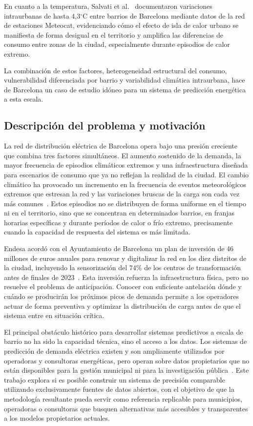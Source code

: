 \documentclass[12pt, a4paper]{article}
\begin{document}
En cuanto a la temperatura, Salvati et al.~\cite{salvati2017} documentaron variaciones intraurbanas de hasta 4,3$^\circ$C entre barrios de Barcelona mediante datos de la red de estaciones Meteocat, evidenciando cómo el efecto de isla de calor urbano se manifiesta de forma desigual en el territorio y amplifica las diferencias de consumo entre zonas de la ciudad, especialmente durante episodios de calor extremo.

La combinación de estos factores, heterogeneidad estructural del consumo, vulnerabilidad diferenciada por barrio y variabilidad climática intraurbana, hace de Barcelona un caso de estudio idóneo para un sistema de predicción energética a esta escala.

\subsection{Descripción del problema y motivación}

La red de distribución eléctrica de Barcelona opera bajo una presión creciente que combina tres factores simultáneos. El aumento sostenido de la demanda, la mayor frecuencia de episodios climáticos extremos y una infraestructura diseñada para escenarios de consumo que ya no reflejan la realidad de la ciudad. El cambio climático ha provocado un incremento en la frecuencia de eventos meteorológicos extremos que estresan la red y las variaciones bruscas de la carga son cada vez más comunes~\cite{moreno2022}. Estos episodios no se distribuyen de forma uniforme en el tiempo ni en el territorio, sino que se concentran en determinados barrios, en franjas horarias específicas y durante períodos de calor o frío extremo, precisamente cuando la capacidad de respuesta del sistema es más limitada.

Endesa acordó con el Ayuntamiento de Barcelona un plan de inversión de 46 millones de euros anuales para renovar y digitalizar la red en los diez distritos de la ciudad, incluyendo la sensorización del 74\% de los centros de transformación antes de finales de 2023~\cite{endesa2021}. Esta inversión refuerza la infraestructura física, pero no resuelve el problema de anticipación. Conocer con suficiente antelación dónde y cuándo se producirán los próximos picos de demanda permite a los operadores actuar de forma preventiva y optimizar la distribución de carga antes de que el sistema entre en situación crítica.

El principal obstáculo histórico para desarrollar sistemas predictivos a escala de barrio no ha sido la capacidad técnica, sino el acceso a los datos. Los sistemas de predicción de demanda eléctrica existen y son ampliamente utilizados por operadoras y consultoras energéticas, pero operan sobre datos propietarios que no están disponibles para la gestión municipal ni para la investigación pública~\cite{jiang2024}. Este trabajo explora si es posible construir un sistema de precisión comparable utilizando exclusivamente fuentes de datos abiertos, con el objetivo de que la metodología resultante pueda servir como referencia replicable para municipios, operadoras o consultoras que busquen alternativas más accesibles y transparentes a los modelos propietarios actuales.
\end{document}
